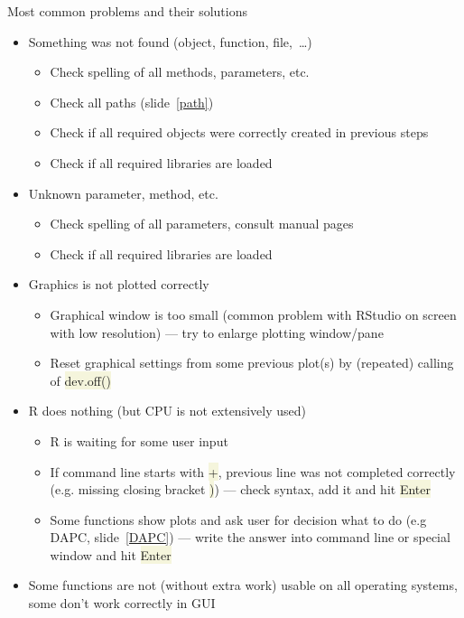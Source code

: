 \documentclass[compress, xelatex, 11pt, xcolor=svgnames, aspectratio=169,
	hyperref={
		bookmarks=true,
		unicode=true,
		colorlinks=true,
		pdftitle={Molecular data in R},
		plainpages=false,
		pdfauthor={Vojtech Zeisek},
		pdfsubject={Course about phylogeny and evolution in R},
		pdfcreator={XeLaTeX},
		pdfkeywords={R, evolution, phylogeny, molecular data},
		linkcolor=Crimson, %
		anchorcolor=Magenta, %
		citecolor=Magenta, %
		filecolor=Magenta, %
		menucolor=Magenta, %
		urlcolor=DodgerBlue, %
		},
	url={hyphens, lowtilde} %
	]{beamer}
\renewcommand{\texttt}[1]{\colorbox{Beige}{{\ttfamily #1}}}
\begin{document}
\begin{frame}[allowframebreaks]{Most common problems and their solutions}
	\label{problems}
	\begin{itemize}
		\item Something was not found (object, function, file,~\ldots)
		\begin{itemize}
			\item Check spelling of all methods, parameters, etc.
			\item Check all paths (slide~\ref{path})
			\item Check if all required objects were correctly created in previous steps
			\item Check if all required libraries are loaded
		\end{itemize}
		\item Unknown parameter, method, etc.
		\begin{itemize}
			\item Check spelling of all parameters, consult manual pages
			\item Check if all required libraries are loaded
		\end{itemize}
		\item Graphics is not plotted correctly
		\begin{itemize}
			\item Graphical window is too small (common problem with RStudio on screen with low resolution) --- try to enlarge plotting window/pane
			\item Reset graphical settings from some previous plot(s) by (repeated) calling of \texttt{dev.off()}
		\end{itemize}
		\item R does nothing (but CPU is not extensively used)
		\begin{itemize}
			\item R is waiting for some user input
			\item If command line starts with \texttt{+}, previous line was not completed correctly (e.g. missing closing bracket \texttt{)}) --- check syntax, add it and hit \texttt{Enter}
			\item Some functions show plots and ask user for decision what to do (e.g DAPC, slide~\ref{DAPC}) --- write the answer into command line or special window and hit \texttt{Enter}
		\end{itemize}
		\item Some functions are not (without extra work) usable on all operating systems, some don't work correctly in GUI

\end{itemize}
\end{frame}
\end{document}
